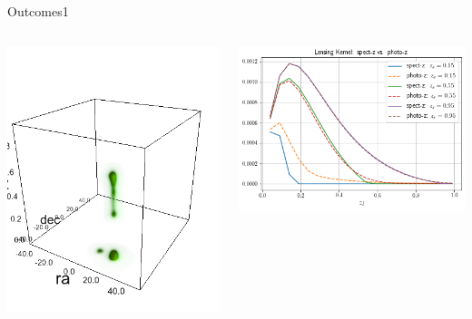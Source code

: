\documentclass[10pt]{beamer}
\begin{document}
\begin{frame}{Outcomes1}
\begin{columns}
\begin{column}{0.5\textwidth}
\includegraphics[height=1.\textwidth]{tau008-z3-m5.png}
\end{column}
\begin{column}{0.5\textwidth}
\includegraphics[height=.8\textwidth]{download.png}
\end{column}
\end{columns}
\end{frame}
\end{document}

